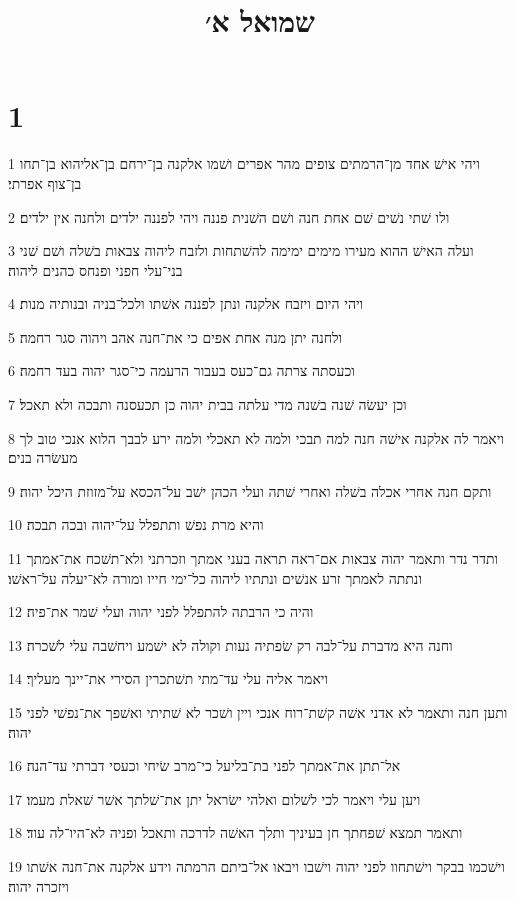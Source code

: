 

\title{שמואל א׳}


\chapter{1}

\par 1 ויהי אישׁ אחד מן־הרמתים צופים מהר אפרים ושׁמו אלקנה בן־ירחם בן־אליהוא בן־תחו בן־צוף אפרתי׃
\par 2 ולו שׁתי נשׁים שׁם אחת חנה ושׁם השׁנית פננה ויהי לפננה ילדים ולחנה אין ילדים׃
\par 3 ועלה האישׁ ההוא מעירו מימים ימימה להשׁתחות ולזבח ליהוה צבאות בשׁלה ושׁם שׁני בני־עלי חפני ופנחס כהנים ליהוה׃
\par 4 ויהי היום ויזבח אלקנה ונתן לפננה אשׁתו ולכל־בניה ובנותיה מנות׃
\par 5 ולחנה יתן מנה אחת אפים כי את־חנה אהב ויהוה סגר רחמה׃
\par 6 וכעסתה צרתה גם־כעס בעבור הרעמה כי־סגר יהוה בעד רחמה׃
\par 7 וכן יעשׂה שׁנה בשׁנה מדי עלתה בבית יהוה כן תכעסנה ותבכה ולא תאכל׃
\par 8 ויאמר לה אלקנה אישׁה חנה למה תבכי ולמה לא תאכלי ולמה ירע לבבך הלוא אנכי טוב לך מעשׂרה בנים׃
\par 9 ותקם חנה אחרי אכלה בשׁלה ואחרי שׁתה ועלי הכהן ישׁב על־הכסא על־מזוזת היכל יהוה׃
\par 10 והיא מרת נפשׁ ותתפלל על־יהוה ובכה תבכה׃
\par 11 ותדר נדר ותאמר יהוה צבאות אם־ראה תראה בעני אמתך וזכרתני ולא־תשׁכח את־אמתך ונתתה לאמתך זרע אנשׁים ונתתיו ליהוה כל־ימי חייו ומורה לא־יעלה על־ראשׁו׃
\par 12 והיה כי הרבתה להתפלל לפני יהוה ועלי שׁמר את־פיה׃
\par 13 וחנה היא מדברת על־לבה רק שׂפתיה נעות וקולה לא ישׁמע ויחשׁבה עלי לשׁכרה׃
\par 14 ויאמר אליה עלי עד־מתי תשׁתכרין הסירי את־יינך מעליך׃
\par 15 ותען חנה ותאמר לא אדני אשׁה קשׁת־רוח אנכי ויין ושׁכר לא שׁתיתי ואשׁפך את־נפשׁי לפני יהוה׃
\par 16 אל־תתן את־אמתך לפני בת־בליעל כי־מרב שׂיחי וכעסי דברתי עד־הנה׃
\par 17 ויען עלי ויאמר לכי לשׁלום ואלהי ישׂראל יתן את־שׁלתך אשׁר שׁאלת מעמו׃
\par 18 ותאמר תמצא שׁפחתך חן בעיניך ותלך האשׁה לדרכה ותאכל ופניה לא־היו־לה עוד׃
\par 19 וישׁכמו בבקר וישׁתחוו לפני יהוה וישׁבו ויבאו אל־ביתם הרמתה וידע אלקנה את־חנה אשׁתו ויזכרה יהוה׃

